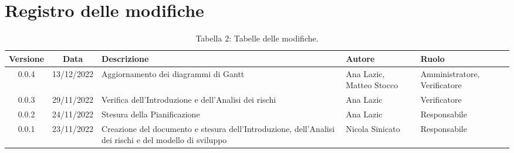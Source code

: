 \section*{Registro delle modifiche}
\begin{table}[H]
	\centering
	\renewcommand\tabularxcolumn[1]{>{\Centering}m{#1}}
	\begin{tabularx}{\textwidth}{| c | c | X | X | X |} 
	\hline
	\textbf{Versione} & \textbf{Data} & \textbf{Descrizione} & \textbf{Autore} & \textbf{Ruolo}\\
	\hline
	0.0.4 & 13/12/2022 & Aggiornamento dei diagrammi di Gantt & Ana Lazic, Matteo Stocco & Amministratore, Verificatore\\
	\hline
	0.0.3 & 29/11/2022 & Verifica dell'Introduzione e dell'Analisi dei rischi & Ana Lazic & Verificatore\\
	\hline
	0.0.2 & 24/11/2022 & Stesura della Pianificazione & Ana Lazic & Responsabile\\
	\hline
	0.0.1 & 23/11/2022 & Creazione del documento e stesura dell'Introduzione, dell'Analisi dei rischi e del modello di sviluppo & Nicola Sinicato & Responsabile\\
 	\hline
	\end{tabularx}
	\vspace{10pt}
	\caption{Tabella 2: Tabelle delle modifiche.}
\end{table}

